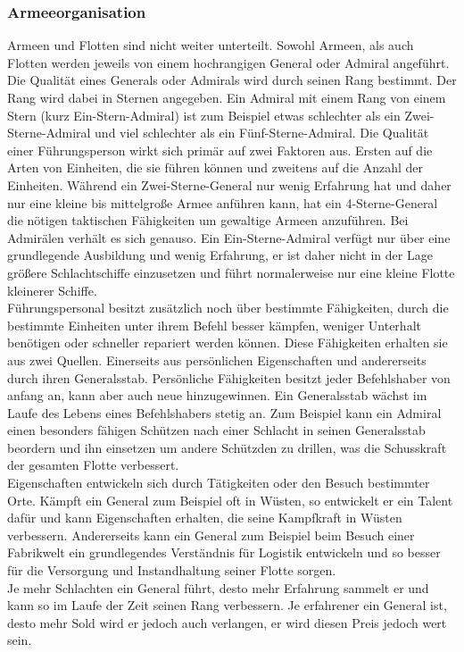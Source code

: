 \documentclass[11pt, a4paper]{article}
\begin{document}
\subsubsection{Armeeorganisation}
Armeen und Flotten sind nicht weiter unterteilt. Sowohl Armeen, als auch Flotten werden jeweils von einem 
hochrangigen General oder Admiral angeführt. Die Qualität eines Generals oder Admirals wird durch seinen Rang
bestimmt. Der Rang wird dabei in Sternen angegeben. Ein Admiral mit einem Rang von einem Stern (kurz 
Ein-Stern-Admiral) ist zum Beispiel etwas schlechter als ein Zwei-Sterne-Admiral und viel schlechter als ein
Fünf-Sterne-Admiral. Die Qualität einer Führungsperson wirkt sich primär auf zwei Faktoren aus. Ersten auf die
Arten von Einheiten, die sie führen können und zweitens auf die Anzahl der Einheiten. Während ein 
Zwei-Sterne-General nur wenig Erfahrung hat und daher nur eine kleine bis mittelgroße Armee anführen kann, hat
ein 4-Sterne-General die nötigen taktischen Fähigkeiten um gewaltige Armeen anzuführen. Bei Admirälen verhält
es sich genauso. Ein Ein-Sterne-Admiral verfügt nur über eine grundlegende Ausbildung und wenig Erfahrung, er
ist daher nicht in der Lage größere Schlachtschiffe einzusetzen und führt normalerweise nur eine kleine Flotte
kleinerer Schiffe.\\
Führungspersonal besitzt zusätzlich noch über bestimmte Fähigkeiten, durch die bestimmte Einheiten unter ihrem 
Befehl besser kämpfen, weniger Unterhalt benötigen oder schneller repariert werden können. 
Diese Fähigkeiten erhalten sie aus zwei Quellen. Einerseits aus persönlichen Eigenschaften und andererseits
durch ihren Generalsstab. Persönliche Fähigkeiten besitzt jeder Befehlshaber von anfang an, kann aber auch 
neue hinzugewinnen. Ein Generalsstab wächst im Laufe des Lebens eines Befehlshabers stetig an. Zum Beispiel 
kann ein Admiral einen besonders fähigen Schützen nach einer Schlacht in seinen Generalsstab beordern und ihn
einsetzen um andere Schützden zu drillen, was die Schusskraft der gesamten Flotte verbessert.\\
Eigenschaften entwickeln sich durch Tätigkeiten oder den Besuch bestimmter Orte. Kämpft ein General zum 
Beispiel oft in Wüsten, so entwickelt er ein Talent dafür und kann Eigenschaften erhalten, die seine 
Kampfkraft in Wüsten verbessern. Andererseits kann ein General zum Beispiel beim Besuch einer Fabrikwelt ein
grundlegendes Verständnis für Logistik entwickeln und so besser für die Versorgung und Instandhaltung seiner 
Flotte sorgen.\\
Je mehr Schlachten ein General führt, desto mehr Erfahrung sammelt er und kann so im Laufe der Zeit seinen
Rang verbessern. Je erfahrener ein General ist, desto mehr Sold wird er jedoch auch verlangen, er wird diesen
Preis jedoch wert sein.
%
\end{document}
